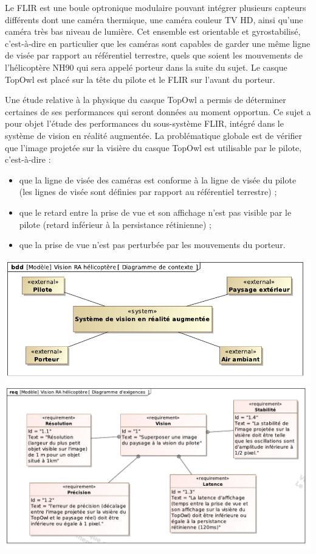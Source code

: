 Le FLIR est une boule optronique modulaire pouvant intégrer plusieurs capteurs différents dont une caméra thermique, une caméra couleur TV HD, ainsi qu'une caméra très bas niveau de lumière. Cet ensemble est orientable et gyrostabilisé, c'est-à-dire en particulier que les caméras sont capables de garder une même ligne de visée par rapport au référentiel terrestre, quels que soient les mouvements de l'hélicoptère NH90 qui sera appelé porteur dans la suite du sujet. Le casque TopOwl est placé sur la tête du pilote et le FLIR sur l'avant du porteur.

Une étude relative à la physique du casque TopOwl a permis de déterminer certaines de ses performances qui seront données au moment opportun. Ce sujet a pour objet l'étude des performances du sous-système FLIR, intégré dans le système de vision en réalité augmentée. La problématique globale est de vérifier que l'image projetée sur la visière du casque TopOwl est utilisable par le pilote, c'est-à-dire :
\begin{itemize}
 \item que la ligne de visée des caméras est conforme à la ligne de visée du pilote (les lignes de visée sont définies par rapport au référentiel terrestre) ;
 \item que le retard entre la prise de vue et son affichage n'est pas visible par le pilote (retard inférieur à la persistance rétinienne) ;
 \item que la prise de vue n'est pas perturbée par les mouvements du porteur.
\end{itemize}

\begin{center}
\includegraphics[width=0.7\linewidth]{img/Diagramme_de_contexte}
\includegraphics[width=0.7\linewidth]{img/Diagramme_d_exigences}
\end{center}


